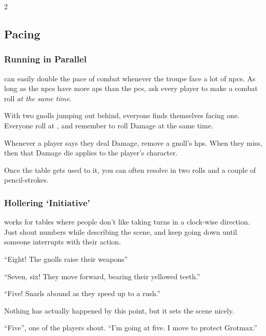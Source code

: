 \begin{multicols}{2}

\subsection{Pacing}

\subsubsection{Running  in Parallel}
can easily double the pace of combat whenever the troupe face a lot of \glspl{npc}.
As long as the \glspl{npc} have more \glspl{ap} than the \glspl{pc}, ask every player to make a combat roll \emph{at the same time}.

\begin{speechtext}
  With two gnolls jumping out behind, everyone finds themselves facing one.
  Everyone roll at \tn[11], and remember to roll Damage at the same time.
\end{speechtext}

Whenever a player says they deal Damage, remove a gnoll's \glspl{hp}.
When they miss, then that Damage die applies to the player's character.

Once the table gets used to it, you can often resolve  in two rolls and a couple of pencil-strokes.

\subsubsection{Hollering `Initiative'}
works for tables where people don't like taking turns in a clock-wise direction.
Just shout numbers while describing the scene, and keep going down until someone interrupts with their action.

\begin{speechtext}

``Eight! The gnolls raise their weapons''

``Seven, six! They move forward, bearing their yellowed teeth.''

``Five! Snarls abound as they speed up to a rush.''

\end{speechtext}

Nothing has actually happened by this point, but it sets the scene nicely.

\null
\begin{speechtext}
  ``Five'', one of the players shout.
  ``I'm going at five.
  I move to protect Grotmax.''


\end{speechtext}
\end{multicols}

